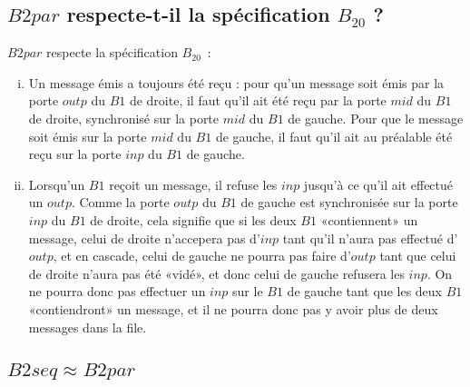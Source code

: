 \documentclass[a4paper,french,12pt]{article}
\def\observationnelle{\approx}
\begin{document}
\subsection{$B2par$ respecte-t-il la spécification $B_20$ ?}
$B2par$ respecte la spécification $B_20$~:
\begin{enumerate}[i)]
\item Un message émis a toujours été reçu : pour qu'un message soit
  émis par la porte $outp$ du $B1$ de droite, il faut qu'il ait été
  reçu par la porte $mid$ du $B1$ de droite, synchronisé sur la porte
  $mid$ du $B1$ de gauche. Pour que le message soit émis sur la porte
  $mid$ du $B1$ de gauche, il faut qu'il ait au préalable été reçu sur
  la porte $inp$ du $B1$ de gauche.
\item Lorsqu'un $B1$ reçoit un message, il refuse les $inp$ jusqu'à ce
  qu'il ait effectué un $outp$. Comme la porte $outp$ du $B1$ de
  gauche est synchronisée sur la porte $inp$ du $B1$ de droite, cela
  signifie que si les deux $B1$ «contiennent» un message, celui de
  droite n'accepera pas d'$inp$ tant qu'il n'aura pas effectué
  d'$outp$, et en cascade, celui de gauche ne pourra pas faire
  d'$outp$ tant que celui de droite n'aura pas été «vidé», et donc
  celui de gauche refusera les $inp$. On ne pourra donc pas effectuer
  un $inp$ sur le $B1$ de gauche tant que les deux $B1$ «contiendront»
  un message, et il ne pourra donc pas y avoir plus de deux messages
  dans la file.
\end{enumerate}

\subsection{$B2seq \observationnelle B2par$}
\end{document}
